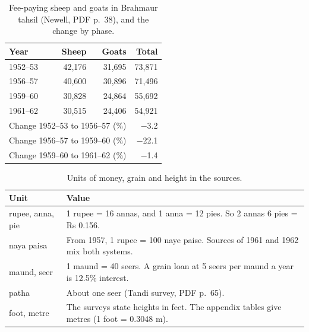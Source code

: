 \documentclass[11pt,a4paper]{article}
\newcommand{\cit}[1]{{\small(#1)}}
\begin{document}
\begin{table}[h]\centering\small
\caption{Fee-paying sheep and goats in Brahmaur tahsil (Newell, PDF p.~38), and the change by phase.}\label{tab:series}
\begin{tabular}{lrrr}\toprule
Year & Sheep & Goats & Total\\\midrule
1952--53 & 42,176 & 31,695 & 73,871\\
1956--57 & 40,600 & 30,896 & 71,496\\
1959--60 & 30,828 & 24,864 & 55,692\\
1961--62 & 30,515 & 24,406 & 54,921\\\midrule
\multicolumn{3}{l}{Change 1952--53 to 1956--57 (\%)} & −3.2\\
\multicolumn{3}{l}{Change 1956--57 to 1959--60 (\%)} & −22.1\\
\multicolumn{3}{l}{Change 1959--60 to 1961--62 (\%)} & −1.4\\
\bottomrule\end{tabular}
\end{table}

\begin{table}[h]\centering\small
\caption{Units of money, grain and height in the sources.}\label{tab:units}
\begin{tabularx}{\textwidth}{lY}\toprule
Unit & Value\\\midrule
rupee, anna, pie & 1 rupee = 16 annas, and 1 anna = 12 pies. So 2 annas 6 pies = Rs 0.156.\\
naya paisa & From 1957, 1 rupee = 100 naye paise. Sources of 1961 and 1962 mix both systems.\\
maund, seer & 1 maund = 40 seers. A grain loan at 5 seers per maund a year is 12.5\% interest.\\
patha & About one seer \cit{Tandi survey, PDF p.~65}.\\
foot, metre & The surveys state heights in feet. The appendix tables give metres (1 foot = 0.3048 m).\\
\bottomrule\end{tabularx}
\end{table}
\end{document}
